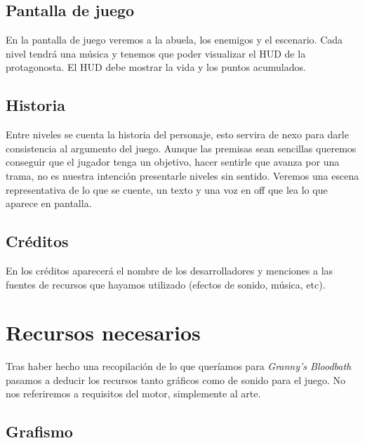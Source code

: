 \documentclass[titlepage]{article}
\begin{document}
\subsection{Pantalla de juego}
En la pantalla de juego veremos a la abuela, los enemigos y el escenario. Cada nivel tendrá una música y tenemos que poder visualizar el HUD de la protagonosta. El HUD debe mostrar la vida y los puntos acumulados.

\subsection{Historia}
Entre niveles se cuenta la historia del personaje, esto servira de nexo para darle consistencia al argumento del juego. Aunque las premisas sean sencillas queremos conseguir que el jugador tenga un objetivo, hacer sentirle que avanza por una trama, no es nuestra intención presentarle niveles sin sentido. Veremos una escena representativa de lo que se cuente, un texto y una voz en off que lea lo que aparece en pantalla.

\subsection{Créditos}
En los créditos aparecerá el nombre de los desarrolladores y menciones a las fuentes de recursos que hayamos utilizado (efectos de sonido, música, etc).

\section{Recursos necesarios}
Tras haber hecho una recopilación de lo que queríamos para \emph{Granny's Bloodbath} pasamos a deducir los recursos tanto gráficos como de sonido para el juego. No nos referiremos a requisitos del motor, simplemente al arte.

\subsection{Grafismo}
\end{document}
